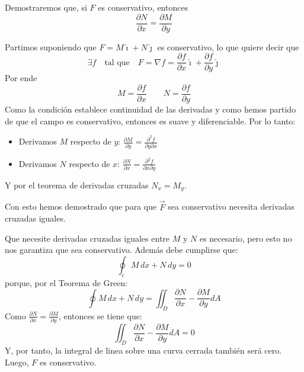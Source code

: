 Demostraremos que, si $F$ es conservativo, entonces 
$$
\frac{\partial N}{\partial x} = \frac{\partial M}{\partial y}
$$

Partimos suponiendo que $F=M\hat{\imath} + N\hat{\jmath}$ es conservativo, lo que quiere decir que
$$
\exists f \quad \text{tal que} \quad F = \nabla f = \frac{\partial f}{\partial x}\hat{\imath} + \frac{\partial f}{\partial y} \hat{\jmath} 
$$
Por ende
$$
M=\frac{\partial f}{\partial x} \qquad N=\frac{\partial f}{\partial y}
$$
Como la condición establece continuidad de las derivadas y como hemos partido de que el campo es conservativo, entonces es suave y diferenciable. Por lo tanto:
\begin{itemize}
\item Derivamos $M$ respecto de $y$: $\displaystyle \frac{\partial M}{\partial y} = \frac{\partial^2 f}{\partial y \partial x}$
\item Derivamos $N$ respecto de $x$: $\displaystyle \frac{\partial N}{\partial x} = \frac{\partial^2 f}{\partial x \partial y}$
\end{itemize}
Y por el teorema de derivadas cruzadas $N_x = M_y$.

Con esto hemos demostrado que para que $\vec F$ sea conservativo necesita derivadas cruzadas iguales.

Que necesite derivadas cruzadas iguales entre $M$ y $N$ es necesario, pero esto no nos garantiza que sea conservativo. Además debe cumplirse que:
$$
\oint_c M\,dx + N \,dy = 0
$$
porque, por el Teorema de Green:
$$
\oint M\,dx + N\,dy = \iint_D \frac{\partial N}{\partial x}-\frac{\partial M}{\partial y}dA
$$
Como $\frac{\partial N}{\partial x}=\frac{\partial M}{\partial y}$, entonces se tiene que:
$$
\iint_D \frac{\partial N}{\partial x}-\frac{\partial M}{\partial y}dA = 0
$$
Y, por tanto, la integral de linea sobre una curva cerrada también será cero. Luego, $F$ es conservativo.
